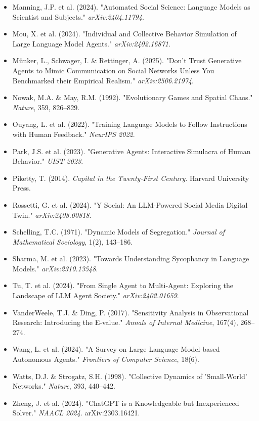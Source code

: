 \begin{itemize}
\item Manning, J.P. et al. (2024). "Automated Social Science: Language Models as Scientist and Subjects." \textit{arXiv:2404.11794}.
\item Mou, X. et al. (2024). "Individual and Collective Behavior Simulation of Large Language Model Agents." \textit{arXiv:2402.16871}.
\item Münker, L., Schwager, I. \& Rettinger, A. (2025). "Don't Trust Generative Agents to Mimic Communication on Social Networks Unless You Benchmarked their Empirical Realism." \textit{arXiv:2506.21974}.
\item Nowak, M.A. \& May, R.M. (1992). "Evolutionary Games and Spatial Chaos." \textit{Nature}, 359, 826–829.
\item Ouyang, L. et al. (2022). "Training Language Models to Follow Instructions with Human Feedback." \textit{NeurIPS 2022}.
\item Park, J.S. et al. (2023). "Generative Agents: Interactive Simulacra of Human Behavior." \textit{UIST 2023}.
\item Piketty, T. (2014). \textit{Capital in the Twenty-First Century}. Harvard University Press.
\item Rossetti, G. et al. (2024). "Y Social: An LLM-Powered Social Media Digital Twin." \textit{arXiv:2408.00818}.
\item Schelling, T.C. (1971). "Dynamic Models of Segregation." \textit{Journal of Mathematical Sociology}, 1(2), 143–186.
\item Sharma, M. et al. (2023). "Towards Understanding Sycophancy in Language Models." \textit{arXiv:2310.13548}.
\item Tu, T. et al. (2024). "From Single Agent to Multi-Agent: Exploring the Landscape of LLM Agent Society." \textit{arXiv:2402.01659}.
\item VanderWeele, T.J. \& Ding, P. (2017). "Sensitivity Analysis in Observational Research: Introducing the E-value." \textit{Annals of Internal Medicine}, 167(4), 268–274.
\item Wang, L. et al. (2024). "A Survey on Large Language Model-based Autonomous Agents." \textit{Frontiers of Computer Science}, 18(6).
\item Watts, D.J. \& Strogatz, S.H. (1998). "Collective Dynamics of 'Small-World' Networks." \textit{Nature}, 393, 440–442.
\item Zheng, J. et al. (2024). "ChatGPT is a Knowledgeable but Inexperienced Solver." \textit{NAACL 2024}. arXiv:2303.16421.
\end{itemize}
